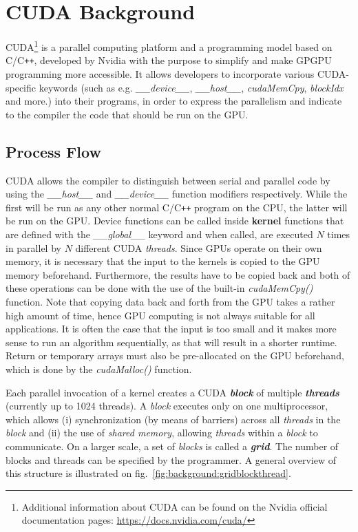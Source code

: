 \newpage
\section{CUDA Background}
CUDA\footnote{Additional information about CUDA can be found on the Nvidia official documentation pages: \url{https://docs.nvidia.com/cuda/}}  is a parallel computing platform and a programming model based on C/C\texttt{++}, developed by Nvidia with the purpose to simplify and make GPGPU programming more accessible. It allows developers to incorporate various CUDA-specific keywords (such as e.g. \textit{\_\_device\_\_}, \textit{\_\_host\_\_}, \textit{cudaMemCpy}, \textit{blockIdx} and more.) into their programs, in order to express the parallelism and indicate to the compiler the code that should be run on the GPU.

\subsection{Process Flow}
CUDA allows the compiler to distinguish between serial and parallel code by using the \textit{\_\_host\_\_} and \textit{\_\_device\_\_} function modifiers respectively. While the first will be run as any other normal C/C\texttt{++} program on the CPU, the latter will be run on the GPU. Device functions can be called inside \textbf{kernel} functions that are defined with the \textit{\_\_global\_\_} keyword and when called, are executed $N$ times in parallel by $N$ different CUDA \textit{threads}. Since GPUs operate on their own memory, it is necessary that the input to the kernels is copied to the GPU memory beforehand. Furthermore, the results have to be copied back and both of these operations can be done with the use of the built-in \textit{cudaMemCpy()} function. Note that copying data back and forth from the GPU takes a rather high amount of time, hence GPU computing is not always suitable for all applications. It is often the case that the input is too small and it makes more sense to run an algorithm sequentially, as that will result in a shorter runtime. Return or temporary arrays must also be pre-allocated on the GPU beforehand, which is done by the \textit{cudaMalloc()} function.

Each parallel invocation of a kernel creates a CUDA \textbf{\textit{block}} of multiple \textbf{\textit{threads}} (currently up to 1024 threads). A \textit{block} executes only on one multiprocessor, which allows (i) synchronization (by means of barriers) across all \textit{threads} in the \textit{block} and (ii) the use of \textit{shared memory}, allowing \textit{threads} within a \textit{block} to communicate. On a larger scale, a set of \textit{blocks} is called a \textbf{\textit{grid}}. The number of blocks and threads can be specified by the programmer. A general overview of this structure is illustrated on fig.~\ref{fig:background:gridblockthread}.

